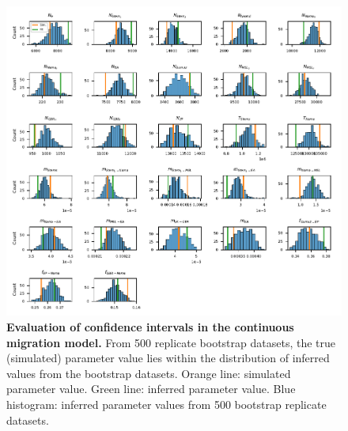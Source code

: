 \documentclass[]{article}
\begin{document}
\begin{figure}[ht]
    \centering
    \includegraphics{figures/supp-simulated-continuous_migration-bootstrap-fits.pdf}
    \caption{
        \textbf{Evaluation of confidence intervals in the continuous migration
        model.} From 500 replicate bootstrap datasets, the true (simulated)
        parameter value lies within the distribution of inferred values from
        the bootstrap datasets. Orange line: simulated parameter value. Green
        line: inferred parameter value. Blue histogram: inferred parameter
        values from 500 bootstrap replicate datasets.
    }
    \label{fig:supp-sim-BS-continuous-migration}
\end{figure}
\end{document}
